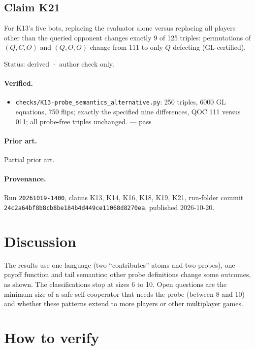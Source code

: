 \documentclass{article}
\begin{document}
\subsection*{Claim K21}

For K13’s five bots, replacing the evaluator alone versus replacing all players other than the queried opponent changes exactly 9 of 125 triples: permutations of $(Q,C,O)$ and $(Q,O,O)$ change from $111$ to only $Q$ defecting (GL-certified).

Status: derived · author check only.

\paragraph{Verified.}
\begin{itemize}
\item \texttt{checks/K13-probe\_semantics\_alternative.py}: 250 triples, 6000 GL equations, 750 flips; exactly the specified nine differences, QOC 111 versus 011; all probe-free triples unchanged. --- pass
\end{itemize}

\paragraph{Prior art.} Partial prior art.


\paragraph{Provenance.}
Run \texttt{20261019-1400}, claims K13, K14, K16, K18, K19, K21, run-folder commit \texttt{24c2a64bf8b8cb8be184b4d449ce11068d8270ea}, published 2026-10-20.

\section{Discussion}

The results use one language (two ``contributes'' atoms and two probes), one payoff function and
tail semantics; other probe definitions change some outcomes, as shown. The classifications stop
at sizes 6 to 10. Open questions are the minimum size of a safe self-cooperator that needs the
probe (between 8 and 10) and whether these patterns extend to more players or other multiplayer
games.

\section{How to verify}
\end{document}
